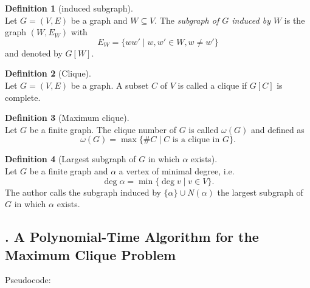 \documentclass[12pt, xcolor=dvipsnames]{scrartcl}
\theoremstyle{definition}
\newtheorem{definition}{Definition}%
\newcommand{\card}[1]{\# #1}
\theoremstyle{definition}
\begin{document}
\begin{definition}[induced subgraph]\ \\
	Let $G = (V,E)$ be a graph and $W\subseteq V$. 
	The \emph{subgraph of $G$ induced by $W$} is
	the graph $(W,E_W)$ with
	\begin{equation*}
		E_W = \{ww'\mid w, w'\in W, w\neq w'\}
	\end{equation*}
	and denoted by $G[W]$.
\end{definition}

\begin{definition}[Clique]\ \\
    Let $G = (V,E)$ be a graph. 
    A subset $C$ of $V$ is called a clique if $G[C]$ is complete.
\end{definition}

\begin{definition}[Maximum clique]\ \\
    Let $G$ be a finite graph.
    The clique number of $G$ is called $\omega(G)$ and defined as
    \[ \omega(G) = \max\{\card C \mid C \text{ is a clique in }G\}. \]
\end{definition}

\begin{definition}[Largest subgraph of $G$ in which $\alpha$ exists]\ \\
	Let $G$ be a finite graph and $\alpha$ a vertex of minimal degree, i.e.
    \[ \deg \alpha = \min\{\deg v \mid v \in V\}. \]
    The author calls the subgraph induced by $\{\alpha\}\cup N(\alpha)$
    the largest subgraph of $G$ in which $\alpha$ exists.
\end{definition}

\subsection*{. A Polynomial-Time Algorithm for the Maximum Clique Problem}

Pseudocode:

\end{document}
